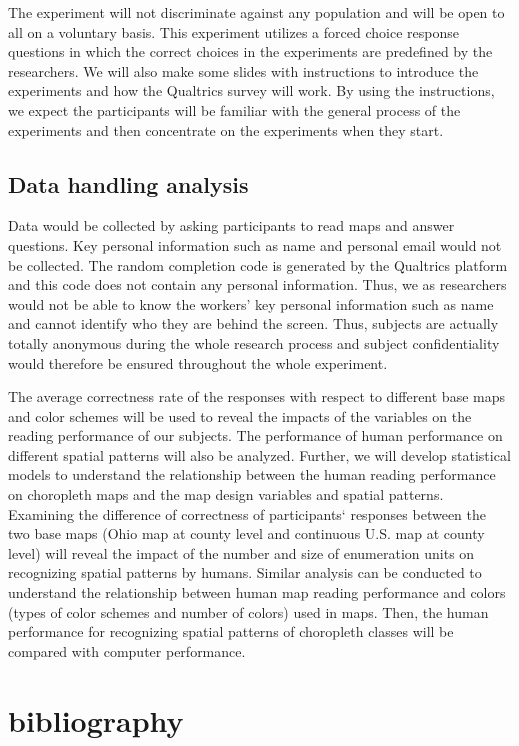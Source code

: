 The experiment will not discriminate against any population and will be open
to all on a voluntary basis. This experiment utilizes a forced choice response questions in which the correct choices in the experiments are predefined by the researchers. We will also make some slides with instructions to introduce the experiments and how the Qualtrics survey will work. By using the instructions, we expect the participants will be familiar with the general process of the experiments and then concentrate on the experiments when they start.


\subsection{Data handling analysis}

Data would be collected by asking participants to read maps and answer questions. Key personal information such as name and personal email would not be collected. The random completion code is generated by the Qualtrics platform and this code does not contain any personal information. Thus, we as researchers would not be able to know the workers' key personal information such as name and cannot identify who they are behind the screen. Thus, subjects are actually totally anonymous during the whole research process and subject confidentiality would therefore be ensured throughout the whole experiment.

The average correctness rate of the responses with respect to different base maps and color schemes will be used to reveal the impacts of the variables on the reading performance of our subjects. The performance of human performance on different spatial patterns will also be analyzed. Further, we will develop statistical models to understand the relationship between the human reading performance on choropleth maps and the map design variables and spatial patterns. 
Examining the difference of correctness of participants` responses
between the two base maps (Ohio map at county level and continuous U.S. map at county level) will reveal the impact of the number and size of enumeration units on recognizing spatial patterns by humans. Similar analysis can be conducted to understand the relationship between human map reading performance and colors (types of color schemes and number of colors) used in maps. Then, the human performance for recognizing spatial patterns of choropleth classes will be compared with computer performance.

\section{bibliography}




